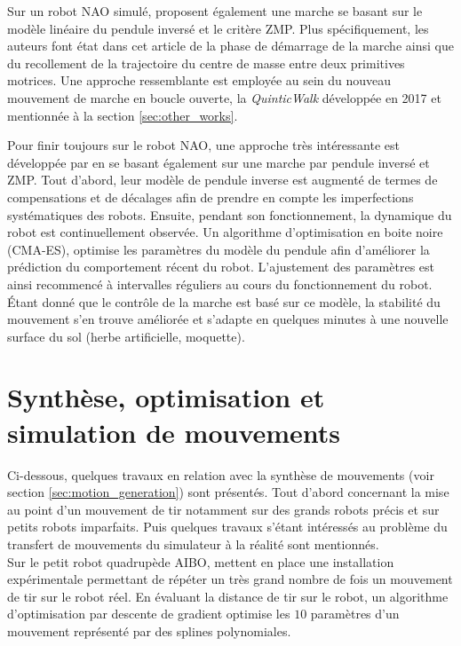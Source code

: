 Sur un robot NAO simulé, \cite{hugel_walking_2012} proposent également
une marche se basant sur le modèle linéaire du pendule inversé
et le critère ZMP.
Plus spécifiquement, les auteurs font état dans cet article de la phase 
de démarrage de la marche ainsi que du recollement de la trajectoire 
du centre de masse entre deux primitives motrices.
Une approche ressemblante est employée au sein du nouveau mouvement de
marche en boucle ouverte, la \textit{QuinticWalk} développée en 
2017 et mentionnée à la section \ref{sec:other_works}.

Pour finir toujours sur le robot NAO, une approche très intéressante est
développée par \cite{seekircher_closed-loop_2016} en se basant
également sur une marche par pendule inversé et ZMP. 
Tout d'abord, leur modèle de pendule inverse est augmenté 
de termes de compensations et de décalages afin de prendre en compte
les imperfections systématiques des robots.
Ensuite, pendant son fonctionnement, la dynamique du robot
est continuellement observée. 
Un algorithme d'optimisation en boite noire (CMA-ES),
optimise les paramètres du modèle du pendule afin d'améliorer 
la prédiction du comportement récent du robot.
L'ajustement des paramètres est ainsi recommencé à intervalles réguliers
au cours du fonctionnement du robot.
Étant donné que le contrôle de la marche est basé sur ce modèle, 
la stabilité du mouvement s'en trouve améliorée et s'adapte 
en quelques minutes à une nouvelle surface du sol (herbe artificielle, moquette).

\section{Synthèse, optimisation et simulation de mouvements\label{sec:biblio_motion}}

Ci-dessous, quelques travaux en relation avec la synthèse de mouvements 
(voir section \ref{sec:motion_generation}) sont présentés.
Tout d'abord concernant la mise au point d'un mouvement de tir notamment 
sur des grands robots \og précis \fg et sur petits robots imparfaits. 
Puis quelques travaux s'étant intéressés au problème du transfert de mouvements du simulateur
à la réalité sont mentionnés.\\

Sur le petit robot quadrupède AIBO, \cite{hausknecht_learning_2011}
mettent en place une installation expérimentale permettant de répéter
un très grand nombre de fois un mouvement de tir sur le robot réel.
En évaluant la distance de tir sur le robot, un algorithme d'optimisation 
par descente de gradient optimise les $10$ paramètres d'un mouvement
représenté par des splines polynomiales.\\

